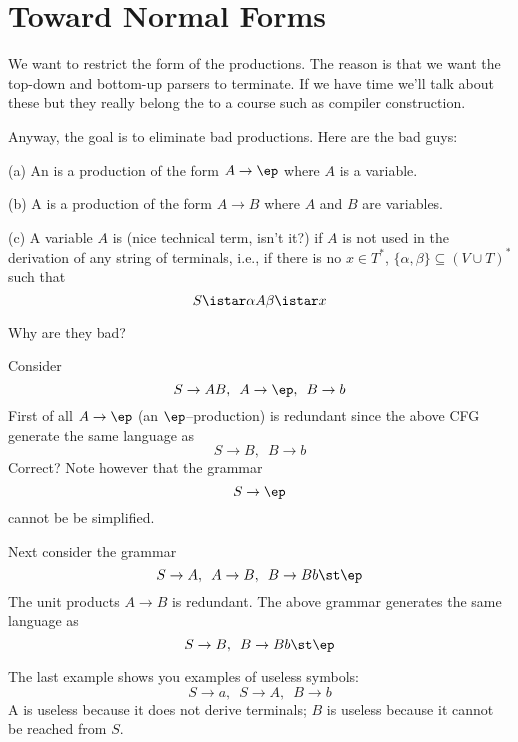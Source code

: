 \newcommand\NULLABLE{\operatorname{NULLABLE}}
\newcommand\TERMINAL{\operatorname{TERMINAL}}

\section{Toward Normal Forms}

We want to restrict the form of the productions. The reason is
that we want the top-down and bottom-up parsers  to terminate. If
we have time we'll talk about these but they really belong the to
a course such as compiler construction.

Anyway, the goal is to eliminate bad productions. 
Here are the bad
guys:

\begin{defn}
 \begin{mylist}
  \item[(a)] An  is a production of the form $A
  \rightarrow \ep$ where $A$ is a variable.
  \item[(b)] A  is a production of the form $A
  \rightarrow B$ where $A$ and $B$ are variables.
  \item[(c)] A variable $A$ is  (nice technical term,
  isn't it?) if $A$ is not used in the derivation of any string of
  terminals, i.e., if there is no $x \in T^*$, $\{ \alpha,\beta \}
  \subseteq (V \cup T)^*$ such that
  \[
   S \istar \alpha A \beta \istar x
  \]
 \end{mylist}
\end{defn}

Why are they bad?

\begin{eg}
Consider 
\[
S \rightarrow AB, \,\,\, A \rightarrow \ep, \,\,\, B \rightarrow b
\]
First of all $A \rightarrow \ep$ (an $\ep$--production) is redundant
since the above CFG generate the same language as
\[
S \rightarrow B, \,\,\, B \rightarrow b
\]
Correct?
Note however that the grammar
\[
S \rightarrow \ep
\]
cannot be be simplified.
\end{eg}

\begin{eg}
Next consider the grammar
\[
S \rightarrow A, \,\,\, A \rightarrow B, \,\,\, B \rightarrow  Bb \st \ep 
\]
The unit products $A \rightarrow B$ is redundant.
The above grammar generates the same language as 
\[
S \rightarrow B, \,\,\, B \rightarrow Bb \st \ep
\]
\end{eg}

\begin{eg}
The last example shows you examples of useless symbols:
\[
S \rightarrow a, \,\,\, S \rightarrow A, \,\,\, B \rightarrow b
\]
A is useless because it does not derive terminals; $B$ is useless 
because it cannot be reached from $S$.
\end{eg}

